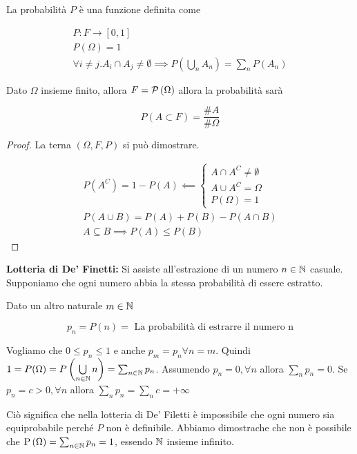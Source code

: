 \begin{defn}
	La probabilità $ P $ è una funzione definita come
	
	\begin{equation}
		\begin{aligned}
			P : F \to [0,1] \\
			P(\Omega) = 1 \\
			\forall i \neq j . A_i \cap A_j \neq \emptyset \implies P \left( \bigcup\limits_{n} A_n \right) = \sum_{n} P(A_n)
		\end{aligned}
	\end{equation}

	Dato $ \Omega $ insieme finito, allora $ F = \mathcal{P}\left(\Omega\right) $ allora la probabilità sarà
	
	\begin{equation*}
		P (A \subset F) = \dfrac{\#A}{\#\Omega}
	\end{equation*}
	
	\begin{proof}
		La terna $ (\Omega, F, P) $ si può dimostrare.
		
		\begin{equation}
			\begin{aligned}
				P(A^C) = 1 - P(A) \impliedby \begin{cases}
					A \cap A^C \neq \emptyset \\
					A \cup A^C = \Omega \\
					P(\Omega) = 1
				\end{cases} \\
				P(A \cup B) = P(A) + P(B) - P(A \cap B) \\
				A \subseteq B \implies P(A) \leq P(B)
			\end{aligned}
		\end{equation}
	\end{proof}
\end{defn}

\begin{exmp}
	\textbf{Lotteria di De' Finetti:}
	Si assiste all'estrazione di un numero $ n \in \mathbb{N} $ casuale. Supponiamo che ogni numero abbia la stessa probabilità di essere estratto.
	
	Dato un altro naturale $ m \in \mathbb{N} $
	
	\begin{equation*}
	p_n = P(n) = \text{ La probabilità di estrarre il numero n}
	\end{equation*}
	
	Vogliamo che  $ 0 \leq p_n \leq 1 $ e anche $ p_m = p_n \forall n = m $. Quindi $ 1 = P(\Omega) = P \left( \bigcup\limits_{n \in \mathbb{N}} n \right) = \sum_{n \in \mathbb{N}} p_n $. Assumendo $ p_n = 0, \forall n $ allora $ \sum_{n} p_n = 0 $. Se $ p_n = c > 0, \forall n $ allora $ \sum_{n} p_n = \sum_{n} c = + \infty $
	
	Ciò significa che nella lotteria di De' Filetti è impossibile che ogni numero sia equiprobabile perché $ P $ non è definibile. Abbiamo dimostrache che non è possibile che $ \text{P}\left(\Omega\right) = \sum_{n \in \mathbb{N}} p_n = 1$, essendo $ \mathbb{N} $ insieme infinito.
\end{exmp}


